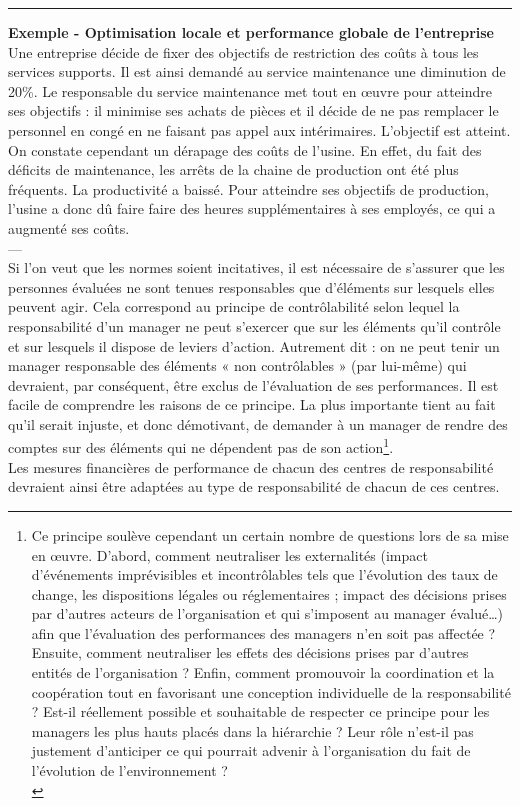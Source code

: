 \documentclass{kaobook}
\begin{document}
\noindent\rule{\textwidth}{0.5pt}
\textbf{Exemple - Optimisation locale et performance globale de l’entreprise}\\
Une entreprise décide de fixer des objectifs de restriction des coûts à tous les services supports. Il est ainsi demandé au service maintenance une diminution de 20\%. Le responsable du service maintenance met tout en œuvre pour atteindre ses objectifs : il minimise ses achats de pièces et il décide de ne pas remplacer le personnel en congé en ne faisant pas appel aux intérimaires. L’objectif est atteint. On constate cependant un dérapage des coûts de l’usine. En effet, du fait des déficits de maintenance, les arrêts de la chaine de production ont été plus fréquents. La productivité a baissé. Pour atteindre ses objectifs de production, l’usine a donc dû faire faire des heures supplémentaires à ses employés, ce qui a augmenté ses coûts.\\
---\\

Si l’on veut que les normes soient incitatives, il est nécessaire de s’assurer que les personnes évaluées ne sont tenues responsables que d’éléments sur lesquels elles peuvent agir. Cela correspond au principe de contrôlabilité selon lequel la responsabilité d’un manager ne peut s’exercer que sur les éléments qu’il contrôle et sur lesquels il dispose de leviers d’action. Autrement dit : on ne peut tenir un manager responsable des éléments « non contrôlables » (par lui-même) qui devraient, par conséquent, être exclus de l’évaluation de ses performances. Il est facile de comprendre les raisons de ce principe. La plus importante tient au fait qu’il serait injuste, et donc démotivant, de demander à un manager de rendre des comptes sur des éléments qui ne dépendent pas de son action\footnote{Ce principe soulève cependant un certain nombre de questions lors de sa mise en œuvre. D'abord, comment neutraliser les externalités (impact d’événements imprévisibles et incontrôlables tels que l’évolution des taux de change, les dispositions légales ou réglementaires ; impact des décisions prises par d’autres acteurs de l’organisation et qui s’imposent au manager évalué…) afin que l’évaluation des performances des managers n’en soit pas affectée ? Ensuite, comment neutraliser les effets des décisions prises par d’autres entités de l’organisation ? Enfin, comment promouvoir la coordination et la coopération tout en favorisant une conception individuelle de la responsabilité ? Est-il réellement possible et souhaitable de respecter ce principe pour les managers les plus hauts placés dans la hiérarchie ? Leur rôle n’est-il pas justement d’anticiper ce qui pourrait advenir à l’organisation du fait de l’évolution de l’environnement ?\\}.\\
Les mesures financières de performance de chacun des centres de responsabilité devraient ainsi être adaptées au type de responsabilité de chacun de ces centres.\\
\end{document}
